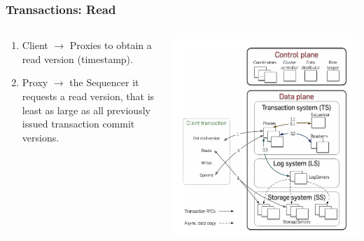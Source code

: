 \begin{frame}
    \frametitle{Transactions: Read}
    \begin{columns}
        \begin{column}{0.5\textwidth}
            \begin{enumerate}
    \item Client $\rightarrow$ Proxies to obtain a read version (timestamp).
    \item Proxy $\rightarrow$ the Sequencer it requests a read version, that is  least as large as all previously issued transaction commit versions.
            \end{enumerate}
        \end{column}
        \begin{column}{0.5\textwidth}
            \centering
            \includegraphics[width=\textwidth]{img/2-Architecture/Architecture and transaction processing.png}
        \end{column}
    \end{columns}
\end{frame}


